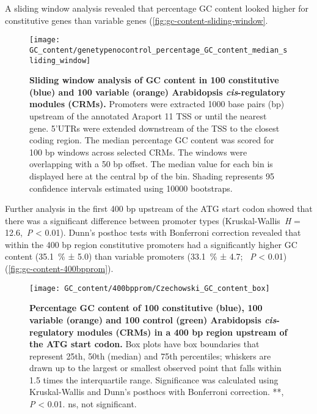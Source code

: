 \documentclass[../main.tex]{subfiles}
\begin{document}
A sliding window analysis revealed that percentage GC content looked higher for constitutive genes than variable genes (\autoref{fig:gc-content-sliding-window}.
\begin{figure}[hbt!]
	\begin{center}
		\capstart
		\texttt{[image: GC\_content/genetypenocontrol\_percentage\_GC\_content\_median\_sliding\_window]}
		\caption{
			\textbf{Sliding window analysis of GC content in 100 constitutive (blue) and 100 variable (orange) Arabidopsis \textit{cis}\hyp{}regulatory modules (CRMs).}
			Promoters were extracted 1000 base pairs (bp) upstream of the annotated Araport 11 \autocite{chengAraport11CompleteReannotation2017} TSS or until the nearest gene.
			5'UTRs were extended downstream of the TSS to the closest coding region.
			The median percentage GC content was scored for 100 bp windows across selected CRMs.
			The windows were overlapping with a 50 bp offset.
			The median value for each bin is displayed here at the central bp of the bin.
			Shading represents 95 confidence intervals estimated using 10000 bootstraps.			
			\label{fig:gc-content-sliding-window}
		}
	\end{center}
\end{figure}

Further analysis in the first 400 bp upstream of the ATG start codon showed that there was a significant difference between promoter types (Kruskal\hyp{}Wallis~\textit{H} = 12.6,~\textit{P} \textless{} 0.01).
Dunn's posthoc tests with Bonferroni correction revealed that within the 400 bp region constitutive promoters had a significantly higher GC content (\SI{35.1}{\percent} ± 5.0) than variable promoters (\SI{33.1}{\percent} ± 4.7; ~\textit{P} \textless{} 0.01) (\autoref{fig:gc-content-400bpprom}).

\begin{figure}[hbt!]
	\begin{center}
		\capstart
		\texttt{[image: GC\_content/400bpprom/Czechowski\_GC\_content\_box]}
		\caption{
			\textbf{Percentage GC content of 100 constitutive (blue), 100 variable (orange) and 100 control (green) Arabidopsis \textit{cis}\hyp{}regulatory modules (CRMs) in a 400 bp region upstream of the ATG start codon.}
			Box plots have box boundaries that represent 25th, 50th (median) and 75th percentiles; whiskers are drawn up to the largest or smallest observed point that falls within 1.5 times the interquartile range.
			Significance was calculated using Kruskal\hyp{}Wallis and Dunn's posthocs with Bonferroni correction.
			**, \textit{P} \textless{} 0.01. ns, not significant.
			\label{fig:gc-content-400bpprom}
		}
	\end{center}
\end{figure}
\end{document}
